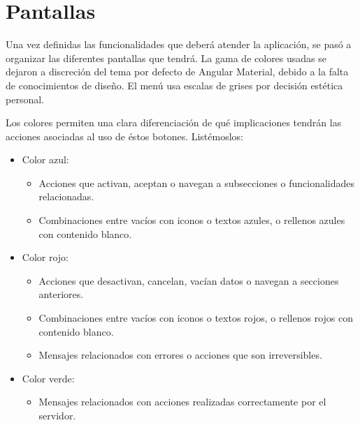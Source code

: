 \section{Pantallas}
Una vez definidas las funcionalidades que deberá atender la aplicación, se pasó a organizar las diferentes pantallas que tendrá. La gama de colores usadas se dejaron a discreción del tema por defecto de Angular Material, debido a la falta de conocimientos de diseño. El menú usa escalas de grises por decisión estética personal.
\vspace{1em}
\par Los colores permiten una clara diferenciación de qué implicaciones tendrán las acciones asociadas al uso de éstos botones. Listémoslos:
\begin{itemize}
    \item Color azul:
    \begin{itemize}
        \item Acciones que activan, aceptan o navegan a subsecciones o funcionalidades relacionadas.
        \item Combinaciones entre vacíos con iconos o textos azules, o rellenos azules con contenido blanco.
    \end{itemize}
    \item Color rojo:
    \begin{itemize}
        \item Acciones que desactivan, cancelan, vacían datos o navegan a secciones anteriores.
        \item Combinaciones entre vacíos con iconos o textos rojos, o rellenos rojos con contenido blanco.
        \item Mensajes relacionados con errores o acciones que son irreversibles.
    \end{itemize}
    \item Color verde:
    \begin{itemize}
        \item Mensajes relacionados con acciones realizadas correctamente por el servidor.
    \end{itemize}
\end{itemize}
